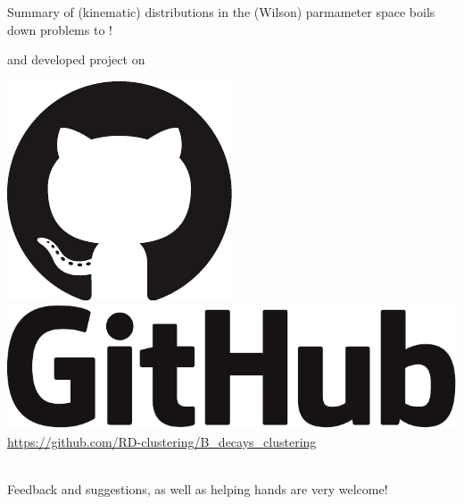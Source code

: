 \begin{frame}{Summary}
%	
%	
%	
	 of (kinematic) distributions in the (Wilson) parmameter space boils down  problems to !
	
	\bigskip
	 and  developed project on\\[2ex]
	\begin{minipage}{\linewidth}
		\includegraphics[height=2.5ex]{figures/software_logos/octocat.pdf}\hspace{0.3em}
		\includegraphics[height=2.5ex]{figures/software_logos/github.pdf}\\
		{\color{purple}\url{https://github.com/RD-clustering/B_decays_clustering}}
	\end{minipage}\\[2ex]
	Feedback and suggestions, as well as helping hands are very welcome!
\end{frame}